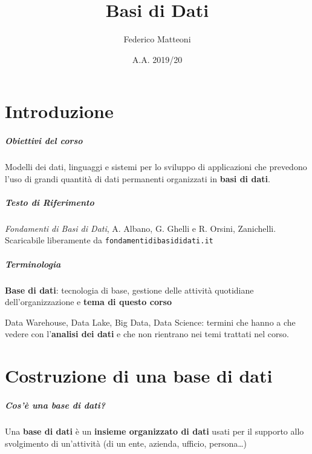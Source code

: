 \documentclass[10pt]{book}
\begin{document}
\renewcommand*\contentsname{Indice}
\title{Basi di Dati}
\author{Federico Matteoni}
\date{A.A. 2019/20}
\maketitle
\tableofcontents
\pagebreak
\chapter*{Introduzione}
\paragraph{Obiettivi del corso} Modelli dei dati, linguaggi e sistemi per lo sviluppo di applicazioni che prevedono l'uso di grandi quantità di dati permanenti organizzati in \textbf{basi di dati}.
\paragraph{Testo di Riferimento} \textit{Fondamenti di Basi di Dati}, A. Albano, G. Ghelli e R. Orsini, Zanichelli. Scaricabile liberamente da \texttt{fondamentidibasididati.it}
\paragraph{Terminologia}
\begin{list}{}{}
	\item \textbf{Base di dati}: tecnologia di base, gestione delle attività quotidiane dell'organizzazione e \textbf{tema di questo corso}
	\item Data Warehouse, Data Lake, Big Data, Data Science: termini che hanno a che vedere con l'\textbf{analisi dei dati} e che non rientrano nei temi trattati nel corso.
\end{list}
\chapter{Costruzione di una base di dati}
\paragraph{Cos'è una base di dati?} Una \textbf{base di dati} è un \textbf{insieme organizzato di dati} usati per il supporto allo svolgimento di un'attività (di un ente, azienda, ufficio, persona\ldots)
\end{document}
